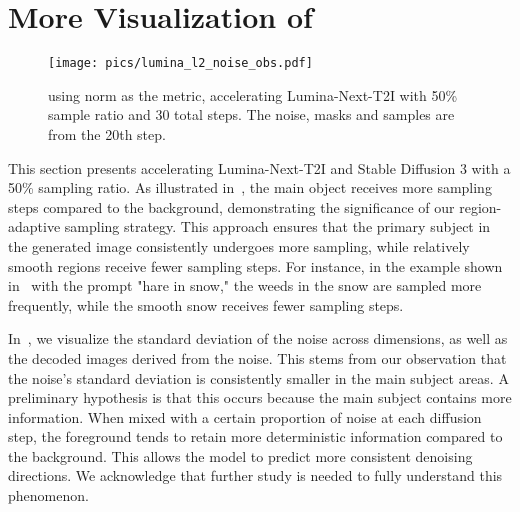 \clearpage
\setcounter{page}{1}
\maketitlesupplementary

\section{More Visualization of \ourmethod{}}
\label{sec:visual}
\begin{figure*}[hb]
    \centering
    \texttt{[image: pics/lumina\_l2\_noise\_obs.pdf]}
    \caption{\ourmethod{} using norm as the metric, accelerating Lumina-Next-T2I with 50\% sample ratio and 30 total steps. The noise, masks and samples are from the 20th step.}
    \label{fig:app_l2}
\end{figure*}
This section presents \ourmethod{} accelerating Lumina-Next-T2I and Stable Diffusion 3 with a 50\% sampling ratio. As illustrated in~, the main object receives more sampling steps compared to the background, demonstrating the significance of our region-adaptive sampling strategy. This approach ensures that the primary subject in the generated image consistently undergoes more sampling, while relatively smooth regions receive fewer sampling steps. For instance, in the example shown in~ with the prompt "hare in snow," the weeds in the snow are sampled more frequently, while the smooth snow receives fewer sampling steps.

In~, we visualize the standard deviation of the noise across dimensions, as well as the decoded images derived from the noise. This stems from our observation that the noise's standard deviation is consistently smaller in the main subject areas. A preliminary hypothesis is that this occurs because the main subject contains more information. When mixed with a certain proportion of noise at each diffusion step, the foreground tends to retain more deterministic information compared to the background. This allows the model to predict more consistent denoising directions. We acknowledge that further study is needed to fully understand this phenomenon.


